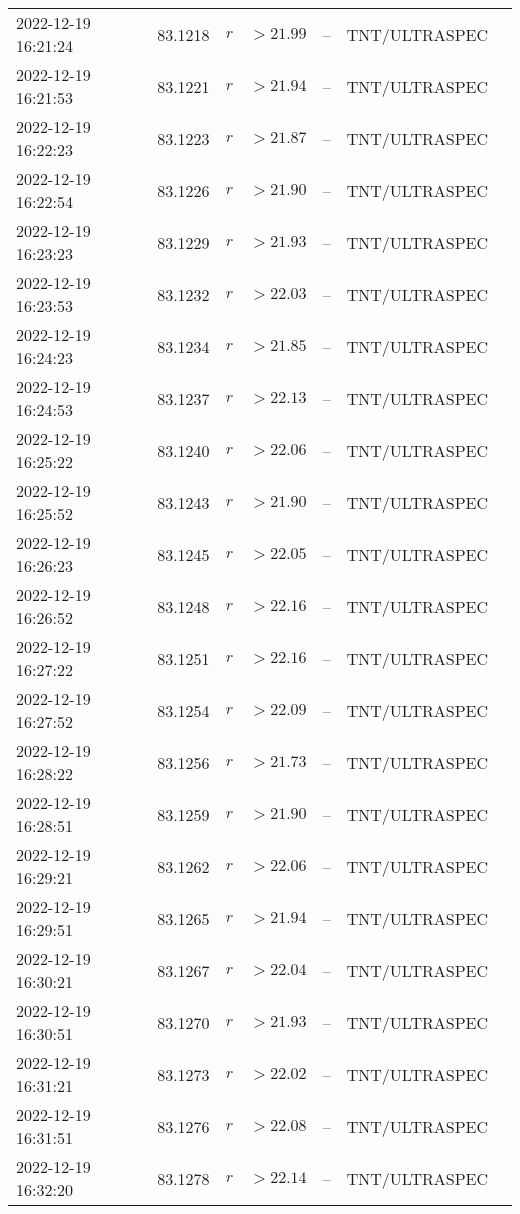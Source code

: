 \documentclass{nature_plusfigure}
\begin{document}
\begin{supplement}
\begin{center}
\begin{longtable}{lllllll}
2022-12-19 16:21:24 & 83.1218 & $r$ & $>21.99$ & -- & TNT/ULTRASPEC &  \\ 
2022-12-19 16:21:53 & 83.1221 & $r$ & $>21.94$ & -- & TNT/ULTRASPEC &  \\ 
2022-12-19 16:22:23 & 83.1223 & $r$ & $>21.87$ & -- & TNT/ULTRASPEC &  \\ 
2022-12-19 16:22:54 & 83.1226 & $r$ & $>21.90$ & -- & TNT/ULTRASPEC &  \\ 
2022-12-19 16:23:23 & 83.1229 & $r$ & $>21.93$ & -- & TNT/ULTRASPEC &  \\ 
2022-12-19 16:23:53 & 83.1232 & $r$ & $>22.03$ & -- & TNT/ULTRASPEC &  \\ 
2022-12-19 16:24:23 & 83.1234 & $r$ & $>21.85$ & -- & TNT/ULTRASPEC &  \\ 
2022-12-19 16:24:53 & 83.1237 & $r$ & $>22.13$ & -- & TNT/ULTRASPEC &  \\ 
2022-12-19 16:25:22 & 83.1240 & $r$ & $>22.06$ & -- & TNT/ULTRASPEC &  \\ 
2022-12-19 16:25:52 & 83.1243 & $r$ & $>21.90$ & -- & TNT/ULTRASPEC &  \\ 
2022-12-19 16:26:23 & 83.1245 & $r$ & $>22.05$ & -- & TNT/ULTRASPEC &  \\ 
2022-12-19 16:26:52 & 83.1248 & $r$ & $>22.16$ & -- & TNT/ULTRASPEC &  \\ 
2022-12-19 16:27:22 & 83.1251 & $r$ & $>22.16$ & -- & TNT/ULTRASPEC &  \\ 
2022-12-19 16:27:52 & 83.1254 & $r$ & $>22.09$ & -- & TNT/ULTRASPEC &  \\ 
2022-12-19 16:28:22 & 83.1256 & $r$ & $>21.73$ & -- & TNT/ULTRASPEC &  \\ 
2022-12-19 16:28:51 & 83.1259 & $r$ & $>21.90$ & -- & TNT/ULTRASPEC &  \\ 
2022-12-19 16:29:21 & 83.1262 & $r$ & $>22.06$ & -- & TNT/ULTRASPEC &  \\ 
2022-12-19 16:29:51 & 83.1265 & $r$ & $>21.94$ & -- & TNT/ULTRASPEC &  \\ 
2022-12-19 16:30:21 & 83.1267 & $r$ & $>22.04$ & -- & TNT/ULTRASPEC &  \\ 
2022-12-19 16:30:51 & 83.1270 & $r$ & $>21.93$ & -- & TNT/ULTRASPEC &  \\ 
2022-12-19 16:31:21 & 83.1273 & $r$ & $>22.02$ & -- & TNT/ULTRASPEC &  \\ 
2022-12-19 16:31:51 & 83.1276 & $r$ & $>22.08$ & -- & TNT/ULTRASPEC &  \\ 
2022-12-19 16:32:20 & 83.1278 & $r$ & $>22.14$ & -- & TNT/ULTRASPEC &  \\ 

\end{longtable}
\end{center}
\end{supplement}
\end{document}
